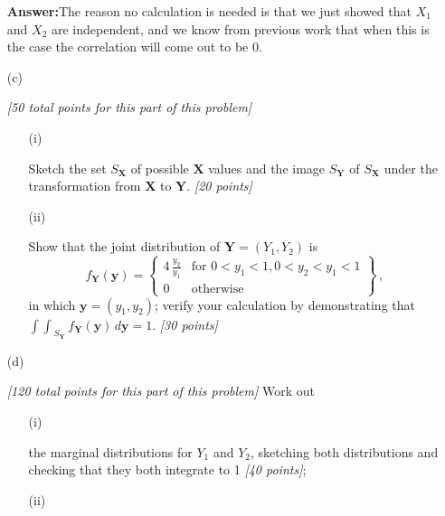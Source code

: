 \documentclass[12pt]{article}
\begin{document}
\begin{itemize}
\textbf{Answer:}The reason no calculation is needed is that we just showed that $X_1$ and $X_2$ are independent, and we know from previous work that when this is the case the correlation will come out to be 0. 
\item[(c)]

\textit{[50 total points for this part of this problem]}

\begin{itemize}

\item[(i)]%

Sketch the set $S_{ \bm{ X } }$ of possible $\bm{ X }$ values and the image $S_{ \bm{ Y } }$ of $S_{ \bm{ X } }$ under the transformation from $\bm{ X }$ to $\bm{ Y }$.  \textit{[20 points]}

\item[(ii)]%

Show that the joint distribution of $\bm{ Y } = ( Y_1, Y_2 )$ is
\begin{equation} \label{e:toy-2}
f_{ \bm{ Y } } ( \bm{ y } ) = \left\{ \begin{array}{cc} 4 \, \frac{ y_2 }{ y_1 } & \text{for } 0 < y_1 < 1, 0 < y_2 < y_1 < 1 \\ 0 & \text{otherwise} \end{array} \right\} \, ,
\end{equation}
in which $\bm{ y } = ( y_1, y_2 )$; verify your calculation by demonstrating that ${\int \! \! \int}_{ S_{ \bm{ Y } } } \, f_{ \bm{ Y } } ( \bm{ y } ) \, d \bm{ y } = 1$. \textit{[30 points]}

\end{itemize}

\item[(d)]

\textit{[120 total points for this part of this problem]} Work out 

\begin{itemize}

\item[(i)]%

the marginal distributions for $Y_1$ and $Y_2$, sketching both distributions and checking that they both integrate to 1 \textit{[40 points]};

\item[(ii)]%


\end{itemize}
\end{itemize}
\end{document}
